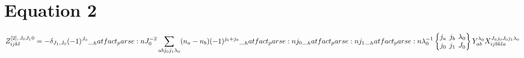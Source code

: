 \documentclass{scrartcl}
\newcommand{\sixj}[6]{\begingroup\setlength{\arraycolsep}{0.2em}\begin{Bmatrix} #1 & #2 & #3 \\ #4 & #5 & #6 \end{Bmatrix}\endgroup}
\begin{document}
\section{Equation 2}
\begin{dmath*}
Z_{i j k l}^{[2],\,{J}_{0} {J}_{1} 0}
= -\delta_{{J}_{1},{J}_{0}} \* (-1)^{{J}_{0}} \* \hatfact{{J}_{0}^{-2}} \*
\sum_{a b {j}_{0} {j}_{1} {{\lambda}}_{0}} \*
(n_a-n_b) \*
(-1)^{{j}_{b}+{j}_{0}} \* \hatfact{{j}_{0}} \* \hatfact{{j}_{1}} \* \hatfact{{{\lambda}}_{0}^{-1}} \*
\sixj{{j}_{a}}{{j}_{b}}{{{\lambda}}_{0}}{{j}_{0}}{{j}_{1}}{{J}_{0}} \*
Y_{a b}^{{{\lambda}}_{0}} \*
X_{i j b k l a}^{{J}_{0} {j}_{0} {J}_{0} {j}_{1} {{\lambda}}_{0}}
\end{dmath*}
\end{document}
